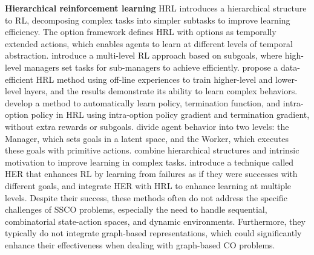 \textbf{Hierarchical reinforcement learning}\quad
HRL introduces a hierarchical structure to RL, decomposing complex tasks into simpler subtasks to improve learning efficiency. 
The option framework \cite{sutton1999between} defines HRL with options as temporally extended actions, which enables agents to learn at different levels of temporal abstraction. 
\citet{dayan1992feudal} introduce a multi-level RL approach based on subgoals, where high-level managers set tasks for sub-managers to achieve efficiently. 
\citet{nachum2018data} propose a data-efficient HRL method using off-line experiences to train higher-level and lower-level layers, and the results demonstrate its ability to learn complex behaviors. 
\citet{bacon2017option} develop a method to automatically learn policy, termination function, and intra-option policy in HRL using intra-option policy gradient and termination gradient, without extra rewards or subgoals. \citet{vezhnevets2017feudal} divide agent behavior into two levels: the Manager, which sets goals in a latent space, and the Worker, which executes these goals with primitive actions.
\citet{kulkarni2016hierarchical} combine hierarchical structures and intrinsic motivation to improve learning in complex tasks. \citet{andrychowicz2017hindsight} introduce a technique called HER that enhances RL by learning from failures as if they were successes with different goals, and \citet{levy2018learning} integrate HER with HRL to enhance learning at multiple levels.
Despite their success, these methods often do not address the specific challenges of SSCO problems, especially the need to handle sequential, combinatorial state-action spaces, and dynamic environments. Furthermore, they typically do not integrate graph-based representations, which could significantly enhance their effectiveness when dealing with graph-based CO problems.